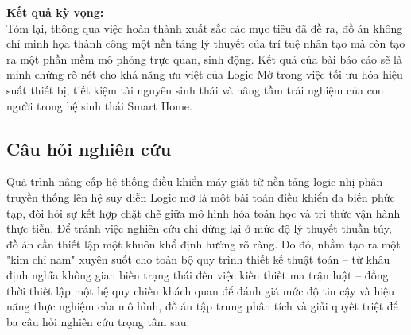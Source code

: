 \documentclass[12pt, a4paper]{article}
\begin{document}
\textbf{Kết quả kỳ vọng:}\\
Tóm lại, thông qua việc hoàn thành xuất sắc các mục tiêu đã đề ra, đồ án không chỉ minh họa thành công một nền tảng lý thuyết của trí tuệ nhân tạo mà còn tạo ra một phần mềm mô phỏng trực quan, sinh động. Kết quả của bài báo cáo sẽ là minh chứng rõ nét cho khả năng ưu việt của Logic Mờ trong việc tối ưu hóa hiệu suất thiết bị, tiết kiệm tài nguyên sinh thái và nâng tầm trải nghiệm của con người trong hệ sinh thái Smart Home.

\subsection{Câu hỏi nghiên cứu}
Quá trình nâng cấp hệ thống điều khiển máy giặt từ nền tảng logic nhị phân truyền thống lên hệ suy diễn Logic mờ là một bài toán điều khiển đa biến phức tạp, đòi hỏi sự kết hợp chặt chẽ giữa mô hình hóa toán học và tri thức vận hành thực tiễn. Để tránh việc nghiên cứu chỉ dừng lại ở mức độ lý thuyết thuần túy, đồ án cần thiết lập một khuôn khổ định hướng rõ ràng. Do đó, nhằm tạo ra một "kim chỉ nam" xuyên suốt cho toàn bộ quy trình thiết kế thuật toán – từ khâu định nghĩa không gian biến trạng thái đến việc kiến thiết ma trận luật – đồng thời thiết lập một hệ quy chiếu khách quan để đánh giá mức độ tin cậy và hiệu năng thực nghiệm của mô hình, đồ án tập trung phân tích và giải quyết triệt để ba câu hỏi nghiên cứu trọng tâm sau:
\end{document}
